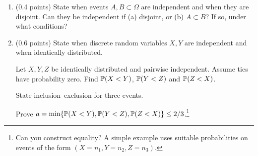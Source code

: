 \documentclass[a4paper]{report}
\newif\ifshowsolutions
\begin{document}
\begin{problem}
\begin{enumerate}
\item (0.4 points) State when events $A,B\subset\Omega$ are independent and when they are disjoint. Can they be independent if (a) disjoint, or (b) $A\subset B$? If so, under what conditions?
\ifshowsolutions
\par\textbf{Solution.} Award 0.1 for each definition and each example. Disjoint means $A\cap B=\emptyset$; independent means $\P(A\cap B)=\P(A)\P(B)$. Both answers are yes: (a) requires $\P(A)=0$ or $\P(B)=0$; (b) requires $\P(A)=0$ or $\P(B)=1$.
\fi
\item (0.6 points) State when discrete random variables $X,Y$ are independent and when identically distributed.
\ifshowsolutions
\par\textbf{Marking.} 0.1 per definition, 0.1 for $\P(X<Y)=1/2$, 0.1 for inclusion--exclusion, with at most 0.3 for these first four items; 0.3 for the last part.
\par\textbf{Solution.} Identical distributions mean $\P(X=a)=\P(Y=a)$ for every $a\in\mathbb R$. Independence means $\P(X=a,Y=b)=\P(X=a)\P(Y=b)$ for all $a,b$.
\fi
Let $X,Y,Z$ be identically distributed and pairwise independent. Assume ties have probability zero. Find $\P(X<Y)$, $\P(Y<Z)$ and $\P(Z<X)$.
\ifshowsolutions
\par\textbf{Solution.} By independence and identical laws, $\P(X<Y)=\P(X>Y)$. Since ties have probability zero and the three comparison probabilities sum to one, each requested probability is $1/2$.
\fi
State inclusion--exclusion for three events.
\ifshowsolutions
\begin{align*}
\P(A\cup B\cup C)={}&\P(A)+\P(B)+\P(C)\\
&-\P(A\cap B)-\P(A\cap C)-\P(B\cap C)+\P(A\cap B\cap C).
\end{align*}
\fi
Prove $a=\min\{\P(X<Y),\P(Y<Z),\P(Z<X)\}\leq2/3$.\footnote{Can you construct equality? A simple example uses suitable probabilities on events of the form $(X=n_1,Y=n_2,Z=n_3)$.}
\ifshowsolutions
\par\textbf{Solution.} Set $A=\{X<Y\}$, $B=\{Y<Z\}$, $C=\{Z<X\}$. Their triple intersection is empty. Their pairwise intersections are disjoint, so
\[\P(A\cap B)+\P(A\cap C)+\P(B\cap C)=\P((A\cap B)\cup(A\cap C)\cup(B\cap C))\leq1.\]
Inclusion--exclusion gives $1\geq3a-1$, as required.
\par\emph{This illustrates how, whichever of three candidates wins, two thirds of voters may prefer another candidate. Three voters can have rankings $A>B>C$, $B>C>A$, $C>A>B$. In probabilistic notation,
$\P(X=1,Y=2,Z=3)=\P(X=2,Y=3,Z=1)=\P(X=3,Y=1,Z=2)=1/3$.
A related observation dates to Condorcet in the late eighteenth century; see the Condorcet paradox.}
\fi
\end{enumerate}
\end{problem}
\end{document}
